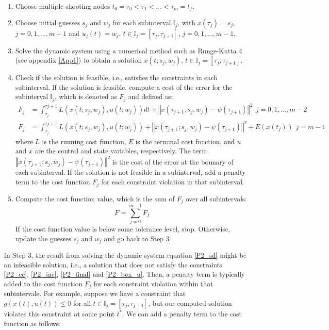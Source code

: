 \documentclass  [
  paper    = a4,
  BCOR     = 10mm,
  twoside,
  fontsize = 12pt,
  fleqn,
  toc      = bibnumbered,
  toc      = listofnumbered,
  numbers  = noendperiod,
  headings = normal,
  listof   = leveldown,
  version  = 3.03
]                                       {scrreprt}
\newcommand{\<}{\langle}
\renewcommand{\>}{\rangle}
\begin{document}
\begin{enumerate}
	\item Choose multiple shooting nodes $t_0 = \tau_0 < \tau_1 < \dots < \tau_m = t_f$.
	\item Choose initial guesses $s_j$ and $w_j$ for each subinterval $\mathbb{I}_j$, with $x(\tau_j) = s_j$, $j=0,1,\dots,m-1$ and $u_j(t) = w_j$, $t \in \mathbb{I}_j = [\tau_j,\tau_{j+1}]$, $j=0,1,\dots,m-1$.
	\item Solve the dynamic system using a numerical method such as Runge-Kutta 4 (see appendix \ref{App1}) to obtain a solution $x(t; s_j, w_j)$, $t\in\mathbb{I}_j = [\tau_j, \tau_{j+1}]$.
	\item Check if the solution is feasible, i.e., satisfies the constraints in each subinterval. If the solution is feasible, compute a cost of the error for the subinterval $\mathbb{I}_j$, which is denoted as $F_j$ and defined as:
	\begin{equation}\label{eq_PW_obj}
		\begin{aligned}
			F_j &= \int_{\tau_j}^{\tau{j+1}} L(x(t;s_j,w_j), u(t;w_j)) dt +  \left\Vert x(\tau_{j+1};s_j,w_j)-\psi(\tau_{j+1})\right\Vert^2  \ \    j= 0, 1, ..., m-2 \\ 
			F_j  & = \int_{\tau_j}^{\tau{j+1}} L(x(t;s_j,w_j), u(t;w_j)) +  \left\Vert x(\tau_{j+1};s_j,w_j)-\psi(\tau_{j+1})\right\Vert^2 +  E (x(t_f))  \ \  j =m-1 
		\end{aligned}
	\end{equation}
	where $L$ is the running cost function, $E$ is the terminal cost function, and $u$ and $x$ are the control and state variables, respectively. The term $\left\Vert x(\tau_{j+1};s_j,w_j)-\psi(\tau_{j+1})\right\Vert^2$ is the cost of the error at the bounary of each subinterval. If the solution is not feasible in a subinterval, add a penalty term to the cost function $F_j$ for each constraint violation in that subinterval. 
	\item Compute the cost function value, which is the sum of $F_j$ over all subintervals:
	$$F = \sum_{j=0}^{m-1} F_j$$
	If the cost function value is below some tolerance level, stop. Otherwise, update the guesses $s_j$ and $w_j$ and go back to Step 3.
\end{enumerate}


In Step 3, the result from solving the dynamic system equation \ref{P2_sd} might be an infeasible solution, i.e., a solution that does not satisfy the constraints \ref{P2_ec}, \ref{P2_inc}, \ref{P2_final} and \ref{P2_box_u}.
Then, a penalty term is typically added to the cost function $F_j$ for each constraint violation within that subintervale.  For example, suppose we have a constraint that $g(x(t), u(t)) \leq 0$ for all $t\in\mathbb{I}_j = [\tau_j, \tau_{j+1}]$, but our computed solution violates this constraint at some point $t^*$. We can add a penalty term to the cost function as follows:
\end{document}
